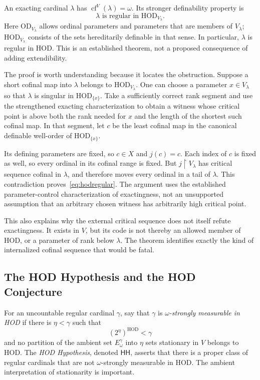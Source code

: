 \documentclass[11pt,letterpaper]{article}
\theoremstyle{definition}
\newcommand{\HOD}{\mathrm{HOD}}
\newcommand{\OD}{\mathrm{OD}}
\newcommand{\HH}{\mathsf{HH}}
\newcommand{\cf}{\operatorname{cf}}
\newcommand{\restr}{\mathbin{\upharpoonright}}
\begin{document}
An exacting cardinal $\lambda$ has $\cf^V(\lambda)=\omega$. Its stronger definability property is
\begin{equation}
 \lambda\text{ is regular in }\HOD_{V_\lambda}.
 \label{eq:hodregular}
\end{equation}
Here $\OD_{V_\lambda}$ allows ordinal parameters and parameters that are members of $V_\lambda$; $\HOD_{V_\lambda}$ consists of the sets hereditarily definable in that sense. In particular, $\lambda$ is regular in HOD. This is an established theorem, not a proposed consequence of adding extendibility. \cite[Theorem~2.10]{abl}

The proof is worth understanding because it locates the obstruction. Suppose a short cofinal map into $\lambda$ belongs to $\HOD_{V_\lambda}$. One can choose a parameter $x\in V_\lambda$ so that $\lambda$ is singular in $\HOD_{\{x\}}$. Take a sufficiently correct rank segment and use the strengthened exacting characterization to obtain a witness whose critical point is above both the rank needed for $x$ and the length of the shortest such cofinal map. In that segment, let $c$ be the least cofinal map in the canonical definable well-order of $\HOD_{\{x\}}$.

Its defining parameters are fixed, so $c\in X$ and $j(c)=c$. Each index of $c$ is fixed as well, so every ordinal in its cofinal range is fixed. But $j\restr V_\lambda$ has critical sequence cofinal in $\lambda$, and therefore moves every ordinal in a tail of $\lambda$. This contradiction proves~\eqref{eq:hodregular}. The argument uses the established parameter-control characterization of exactingness, not an unsupported assumption that an arbitrary chosen witness has arbitrarily high critical point. \cite{abl}

This also explains why the external critical sequence does not itself refute exactingness. It exists in $V$, but its code is not thereby an allowed member of HOD, or a parameter of rank below $\lambda$. The theorem identifies exactly the kind of internalized cofinal sequence that would be fatal.

\subsection{The HOD Hypothesis and the HOD Conjecture}

For an uncountable regular cardinal $\gamma$, say that $\gamma$ is \emph{$\omega$-strongly measurable in HOD} if there is $\eta<\gamma$ such that
\[
 (2^\eta)^{\HOD}<\gamma
\]
and no partition of the ambient set $E^\gamma_\omega$ into $\eta$ sets stationary in $V$ belongs to HOD. The \emph{HOD Hypothesis}, denoted $\HH$, asserts that there is a proper class of regular cardinals that are not $\omega$-strongly measurable in HOD. The ambient interpretation of stationarity is important. \cite{bkw,abl}
\end{document}
